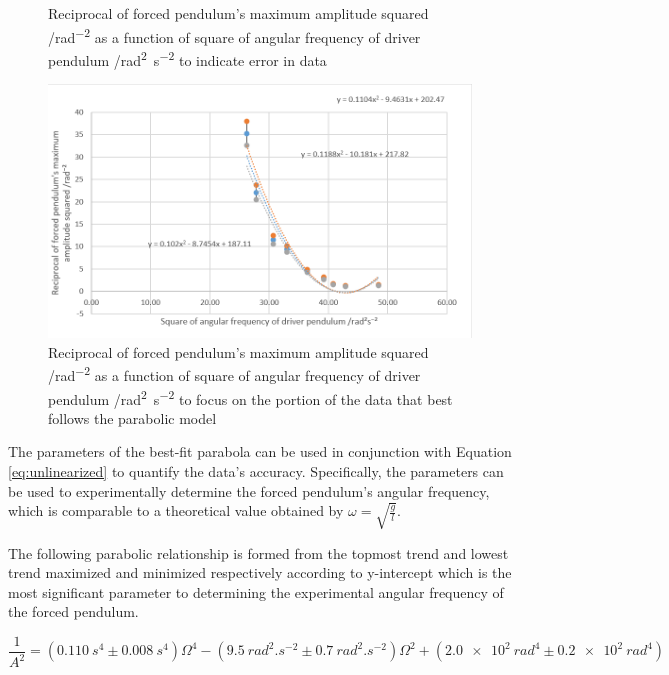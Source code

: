 \documentclass[letterpaper, 12pt]{article}
\begin{document}
\begin{paracol}{3}
\begin{figure}[H]
        \caption{Reciprocal of forced pendulum's maximum amplitude squared /\unit{rad^{-2}} as a function of square of angular frequency of driver pendulum /\unit{rad^2.s^{-2}} to indicate error in data}
        \label{fig:fullGraphOfModified}
    \end{figure}
    \switchcolumn
    \begin{figure}[H]
        \centering
        \includegraphics[width=\linewidth]{restrictedGraph.png}
        \caption{Reciprocal of forced pendulum's maximum amplitude squared /\unit{rad^{-2}} as a function of square of angular frequency of driver pendulum /\unit{rad^2.s^{-2}} to focus on the portion of the data that best follows the parabolic model}
        \label{fig:restrictedGraph}
    \end{figure}
\end{paracol}

The parameters of the best-fit parabola can be
used in conjunction with Equation \ref*{eq:unlinearized}
to quantify the data's accuracy. Specifically,
the parameters can be used to experimentally determine
the forced pendulum's angular frequency, which is
comparable to a theoretical value obtained by \(\omega = \sqrt{\frac{g}{l}}\).

The following parabolic relationship is formed from the
topmost trend and lowest trend maximized and minimized
respectively according to y-intercept which
is the most significant parameter to determining
the experimental angular frequency of the forced pendulum.

\begin{equation}
    \frac{1}{A^2} = ( \SI{0.110}{s^4} \pm \SI{0.008}{s^4} )\Omega^4 - ( \SI{9.5}{rad^2.s^{-2}} \pm \SI{0.7}{rad^2.s^{-2}} )\Omega^2 + ( \SI{2.0e2}{rad^4} \pm \SI{0.2e2}{rad^4} )
\end{equation}
\end{document}
